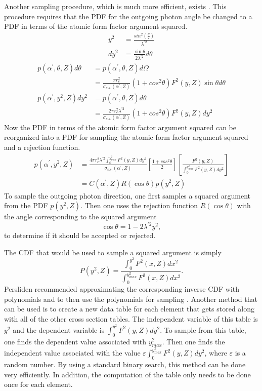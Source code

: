 Another sampling procedure, which is much more efficient, exists
\citep{persliden_monte_1983}. This procedure requires that the PDF for the 
outgoing photon angle be changed to a PDF in terms of the atomic form factor 
argument squared.
\begin{align}
  y^2 & = \frac{sin^2\left(\frac{\theta}{2} \right)}{\lambda^{'2}} \\
  dy^2 & = \frac{\sin{\theta}}{2\lambda^{'2}} d\theta \nonumber
\end{align}
\begin{align}
  p(\alpha^{'},\theta,Z)d\theta & = p(\alpha^{'},\theta,Z)d\Omega \nonumber \\
  & = \frac{\pi r_e^2}{\sigma_{c.s.}(\alpha^{'},Z)}(1 + cos^2\theta) F^2(y,Z) 
  \sin{\theta} d\theta \nonumber \\
  p(\alpha^{'},y^2,Z)dy^2 & = p(\alpha^{'},\theta,Z)d\theta \nonumber \\
  & = \frac{2\pi r_e^2 \lambda^{'2}}{\sigma_{c.s.}(\alpha^{'},Z)}
  (1 + cos^2\theta)F^2(y,Z) dy^2 
\end{align}
Now the PDF in terms of the atomic form factor argument squared can be 
reorganized into a PDF for sampling the atomic form factor argument squared
and a rejection function.
\begin{align}
  p(\alpha^{'},y^2,Z) & = 
  \frac{4\pi r_e^2 \lambda^{'2} \int_0^{y_{max}^2}F^2(y,Z)dy^2}
  {\sigma_{c.s.}(\alpha^{'},Z)} \left[\frac{1+cos^2\theta}{2} \right]
  \left[\frac{F^2(y,Z)}{\int_0^{y_{max}^2}F^2(y,Z)dy^2} \right] \nonumber \\
  & = C(\alpha^{'},Z)R(\cos{\theta})p(y^2,Z)
\end{align}
To sample the outgoing photon direction, one first samples a squared
argument from the PDF $p(y^2,Z)$. Then one uses the rejection function 
$R(\cos{\theta})$ with the angle corresponding to the squared argument
\begin{equation}
  \cos{\theta} = 1 - 2\lambda^{'2}y^2,
\end{equation}
to determine if it should be accepted or rejected.

The CDF that would be used to sample a squared argument is simply
\begin{equation}
  P(y^2,Z) = \frac{\int_0^{y^2}F^2(x,Z)dx^2}{\int_0^{y_{max}^2}F^2(x,Z)dx^2}.
\end{equation}
Persliden recommended approximating the corresponding inverse CDF with 
polynomials and to then use the polynomials for sampling 
\citep{persliden_monte_1983}. Another method that can be used is to create a 
new data table for each element that gets stored along with all of the other 
cross section tables. The independent variable of this table is $y^2$ and the
dependent variable is $\int_0^{y^2}F^2(y,Z)dy^2$. To sample from this table, one
finds the dependent value associated with $y_{max}^2$. Then one finds the 
independent value associated with the value 
$\varepsilon \int_0^{y_{max}^2}F^2(y,Z)dy^2$, where $\varepsilon$ is a random 
number. By using a standard binary search, this method can be done very 
efficiently. In addition, the computation of the table only needs to be done 
once for each element.

